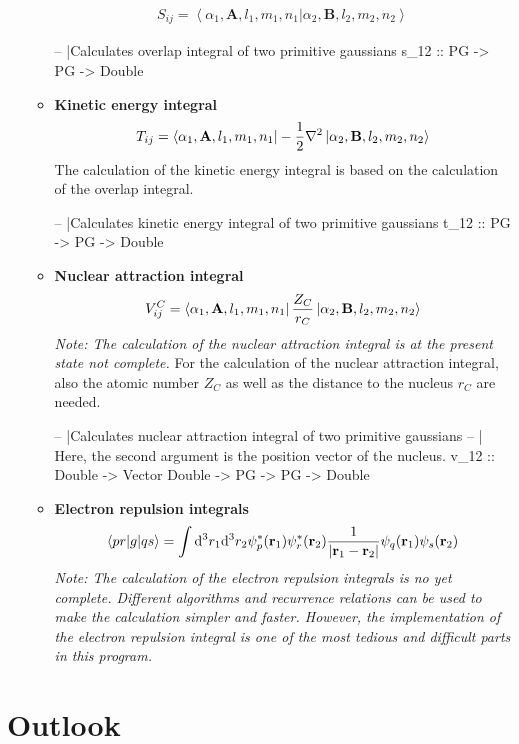 \documentclass[twoside,        %
			   11pt,			%
               BCOR10mm,       %
               ngerman,english  %
               ]{scrartcl}
\begin{document}
\begin{itemize}
\begin{itemize}
\begin{align*}
S_{ij} = \left<\alpha_1, \mathbf{A}, l_1, m_1, n_1 |\alpha_2, \mathbf{B}, l_2, m_2, n_2 \right>
\end{align*}
\begin{code}
-- |Calculates overlap integral of two primitive gaussians
s_12 :: PG -> PG -> Double
\end{code}
\item \textbf{Kinetic energy integral}\\
\begin{align*}
T_{ij} = \bra{\alpha_1, \mathbf{A}, l_1, m_1, n_1}-\frac{1}{2}\nabla^2\ket{\alpha_2, \mathbf{B}, l_2, m_2, n_2}
\end{align*}
The calculation of the kinetic energy integral is based on the calculation of the overlap integral.
\begin{code}
-- |Calculates kinetic energy integral of two primitive gaussians
t_12 :: PG -> PG -> Double
\end{code}
\item \textbf{Nuclear attraction integral}\\
\begin{align*}
V_{ij}^C = \bra{\alpha_1, \mathbf{A}, l_1, m_1, n_1}\frac{Z_C}{r_C}\ket{\alpha_2, \mathbf{B}, l_2, m_2, n_2}
\end{align*}
\emph{Note: The calculation of the nuclear attraction integral is at the present state not complete.} For the calculation of the nuclear attraction integral, also the atomic number $Z_C$ as well as the distance to the nucleus $r_C$ are needed.
\begin{code}
-- |Calculates nuclear attraction integral of two primitive gaussians
-- | Here, the second argument is the position vector of the nucleus.
v_12 :: Double -> Vector Double -> PG -> PG -> Double
\end{code}
\item \textbf{Electron repulsion integrals}\\
\begin{align*}
\left<pr|g|qs\right> = \int \mathrm{d}^3 r_1 \mathrm{d}^3 r_2 \psi_p^*(\mathbf{r}_1) \psi_r^*(\mathbf{r}_2) \frac{1}{\left| \mathbf{r}_1 -\mathbf{r}_2 \right|} \psi_q(\mathbf{r}_1) \psi_s(\mathbf{r}_2)
\end{align*} \emph{Note: The calculation of the electron repulsion integrals is no yet complete. Different algorithms and recurrence relations can be used to make the calculation simpler and faster. However, the implementation of the electron repulsion integral is one of the most tedious and difficult parts in this program.}
\end{itemize}
\end{itemize}

\section{Outlook}

\pagebreak

    \nocite{*}
 
\end{document}

